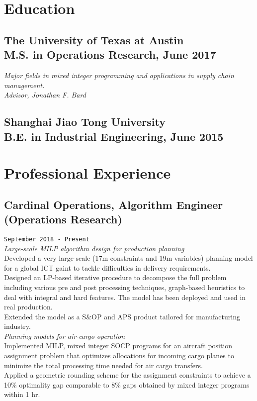 \documentclass[11pt, letter]{article}
\title{}
\begin{document}
\maketitle


\section{Education}
\subsection{The University of Texas at Austin \\
  \bullet \quad M.S. in Operations Research, June 2017}
\textit{Major fields in mixed integer programming and applications in
supply chain management.} \\
\textit{Advisor, Jonathan F. Bard} \\
\subsection{Shanghai Jiao Tong University \\
  \bullet \quad B.E. in Industrial Engineering, June 2015}

\section{Professional Experience}

\subsection{Cardinal Operations, Algorithm Engineer (Operations
Research)}
\texttt{September 2018 - Present} \\
\textit{Large-scale MILP algorithm design for production planning} \\
\bullet\quad Developed a very large-scale (17m constraints and 19m
variables) planning model for a global ICT gaint to tackle difficulties
in delivery requirements. \\
\bullet\quad Designed an LP-based iterative procedure to decompose the
full problem including various pre and post processing techniques,
graph-based heuristics to deal with integral and hard features. The
model has been deployed and used in real production. \\
\bullet\quad Extended the model as a S\&OP and APS product tailored for
manufacturing industry. \\
\textit{Planning models for air-cargo operation} \\
\bullet\quad Implemented MILP, mixed integer SOCP programs for an
aircraft position assignment problem that optimizes allocations for
incoming cargo planes to minimize the total processing time needed for
air cargo transfers. \\
\bullet\quad Applied a geometric rounding scheme for the assignment
constraints to achieve a 10\% optimality gap comparable to 8\% gaps
obtained by mixed integer programs within 1 hr. \\
\end{document}
